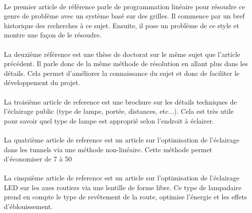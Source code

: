 
\paragraph{}
Le premier article de r\'ef\'erence \cite{mainref} parle de programmation lin\'eaire pour r\'esoudre ce genre de probl\`eme avec un syst\`eme bas\'e sur des grilles. Il commence par un bref historique des recherches \`a ce sujet. Ensuite, il pose un probl\`eme de ce style et montre une fa\c{c}on de le r\'esoudre.



\paragraph{}
La deuxi\`eme r\'ef\'erence \cite{phdref} est une th\`ese de doctorat sur le m\^eme sujet que l'article pr\'ec\'edent. Il parle donc de la m\^eme m\'ethode de r\'esolution en allant plus dans les d\'etails. Cela permet d'am\'eliorer la connaissance du sujet et donc de faciliter le d\'eveloppement du projet.

\paragraph{}
La troisi\`eme article de reference \cite{ascenref} est une brochure sur les détails techniques de l'éclairage public (type de lampe, portée, distances, etc...). Cela est très utile pour savoir quel type de lampe est approprié selon l'endroit à éclairer.

\paragraph{}
La quatri\`eme article de reference \cite{tunnelref} est un article sur l'optimisation de l'éclairage dans les tunnels via une méthode non-linéaire. Cette méthode permet d'économiser de 7 à 50%

\paragraph{}
La cinqui\`eme article de reference \cite{ledref} est un article sur l'optimisation de l'éclairage LED sur les axes routiers via une lentille de forme libre. Ce type de lampadaire prend en compte le type de revêtement de la route, optimise l'énergie et les effets d'éblouissement.